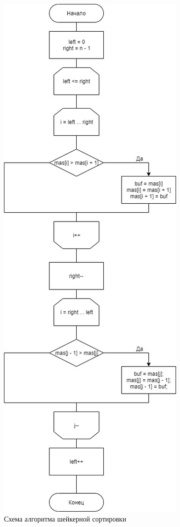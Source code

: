 \documentclass[12pt]{report}
\begin{document}
\begin{figure}[h]
\centering
\includegraphics[scale=0.45]{diag_shaker.jpg}
\caption{Схема алгоритма шейкерной сортировки}
\label{fig:mpr}
\end{figure}
\end{document}
